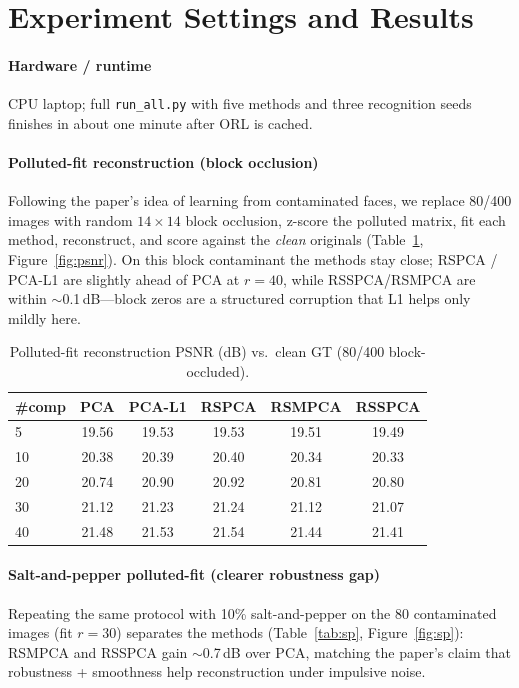 \documentclass[11pt,a4paper]{article}
\begin{document}
\section{Experiment Settings and Results}
\paragraph{Hardware / runtime}
CPU laptop; full \texttt{run\_all.py} with five methods and three recognition seeds finishes in about one minute after ORL is cached.

\paragraph{Polluted-fit reconstruction (block occlusion)}
Following the paper's idea of learning from contaminated faces, we replace 80/400 images with random $14\times 14$ block occlusion, z-score the polluted matrix, fit each method, reconstruct, and score against the \emph{clean} originals (Table~\ref{tab:psnr}, Figure~\ref{fig:psnr}).
On this block contaminant the methods stay close; RSPCA / PCA-L1 are slightly ahead of PCA at $r{=}40$, while RSSPCA/RSMPCA are within $\sim$0.1\,dB---block zeros are a structured corruption that L1 helps only mildly here.

\begin{table}[H]
\centering
\caption{Polluted-fit reconstruction PSNR (dB) vs.\ clean GT (80/400 block-occluded).}
\label{tab:psnr}
\small
\begin{tabular}{lccccc}
\toprule
\#comp & PCA & PCA-L1 & RSPCA & RSMPCA & RSSPCA \\
\midrule
5  & 19.56 & 19.53 & 19.53 & 19.51 & 19.49 \\
10 & 20.38 & 20.39 & 20.40 & 20.34 & 20.33 \\
20 & 20.74 & 20.90 & 20.92 & 20.81 & 20.80 \\
30 & 21.12 & 21.23 & 21.24 & 21.12 & 21.07 \\
40 & 21.48 & 21.53 & 21.54 & 21.44 & 21.41 \\
\bottomrule
\end{tabular}
\end{table}

\paragraph{Salt-and-pepper polluted-fit (clearer robustness gap)}
Repeating the same protocol with 10\% salt-and-pepper on the 80 contaminated images (fit $r{=}30$) separates the methods (Table~\ref{tab:sp}, Figure~\ref{fig:sp}):
RSMPCA and RSSPCA gain $\sim$0.7\,dB over PCA, matching the paper's claim that robustness + smoothness help reconstruction under impulsive noise.
\end{document}
